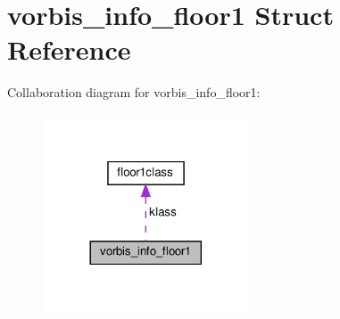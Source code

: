 \hypertarget{structvorbis__info__floor1}{}\section{vorbis\+\_\+info\+\_\+floor1 Struct Reference}
\label{structvorbis__info__floor1}


Collaboration diagram for vorbis\+\_\+info\+\_\+floor1\+:
\nopagebreak
\begin{figure}[H]
\begin{center}
\leavevmode
\includegraphics[width=173pt]{structvorbis__info__floor1__coll__graph}
\end{center}
\end{figure}
